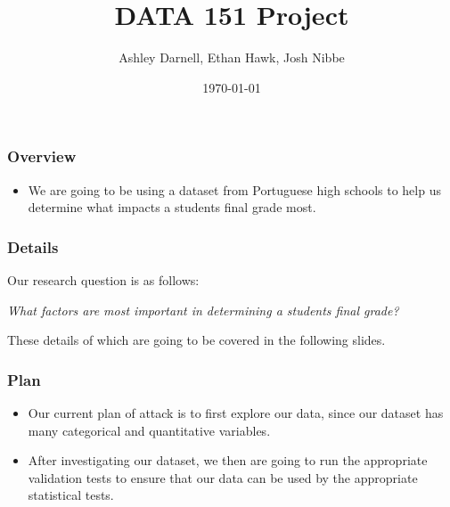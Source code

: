 \documentclass{beamer}
\title{DATA 151 Project}
\subtitle{}
\author{Ashley Darnell, Ethan Hawk, Josh Nibbe}
\institute{Valparaiso University}
\date{\today}
\begin{document}
\begin{frame}
\titlepage
\end{frame}


\begin{frame}
\frametitle{Overview}
  \begin{itemize}
    \item We are going to be using a dataset from Portuguese high schools to help us determine what impacts a students final grade most.
  \end{itemize}
\end{frame}


\begin{frame}
\frametitle{Details}
Our research question is as follows:

  \begin{center}
    \textit{What factors are most important in determining a students final grade?}
  \end{center}


These details of which are going to be covered in the following slides.  
\end{frame}


\begin{frame}
\frametitle{Plan}
  \begin{itemize}
    \item Our current plan of attack is to first explore our data, since our dataset has many categorical and 
quantitative variables.

    \item After investigating our dataset, we then are going to run the appropriate validation tests to ensure that our data
can be used by the appropriate statistical tests.

  \end{itemize}
\end{frame}
\end{document}
